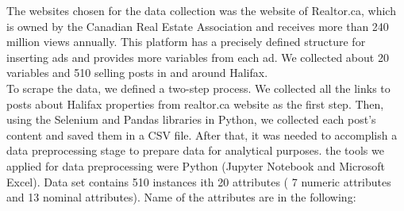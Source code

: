 \documentclass{article}
\begin{document}
The websites chosen for the data collection was the website of Realtor.ca, which is owned by the Canadian Real Estate Association and receives more than 240 million views annually. This platform has a precisely defined structure for inserting ads and provides more variables from each ad. We collected about 20 variables and 510 selling posts in and around Halifax. \\

To scrape the data, we defined a two-step process. We collected all the links to posts about Halifax properties from realtor.ca website as the first step. Then, using the Selenium and Pandas libraries in Python, we collected each post's content and saved them in a CSV file. After that, it was needed to accomplish a data preprocessing stage to prepare data for analytical purposes. the tools we applied for data preprocessing were Python (Jupyter Notebook and Microsoft Excel).
Data set contains 510 instances ith 20 attributes ( 7 numeric attributes and 13 nominal attributes). Name of the attributes are in the following:
\end{document}
